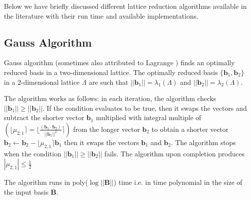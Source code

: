 Below we have briefly discussed different lattice reduction algorithms available in the literature with their run time and available implementations.




\subsection{Gauss Algorithm}
Gauss algorithm \cite{bremner2011lattice} (sometimes also attributed to Lagrange \cite{de1773recherches}) finds an optimally reduced basis in a two-dimensional lattice.
The optimally reduced basis $\{\pmb{b}_1,\pmb{b}_2\}$ in a $2$-dimensional lattice $\Lambda$ are such that $||\pmb{b}_1||=\lambda_1(\Lambda)$ and $||\pmb{b}_2||=\lambda_2(\Lambda)$.


The algorithm works as follows: in each iteration, the algorithm checks $||\pmb{b}_1|| \geq ||\pmb{b}_2||$.
If the condition evaluates to be true, then it swaps the vectors and subtract the shorter vector $\pmb{b}_1$ multiplied with integral multiple of $(\lfloor\mu_{2,1}\rceil = \lfloor \frac{(\pmb{b}_1 \cdot \pmb{b}_2)}{||\pmb{b}_1||^2}\rceil)$ from the longer vector $\pmb{b}_2$ to obtain a shorter vector $\pmb{b}_2 \leftarrow \pmb{b}_2 - \lfloor \mu_{2,1}\rceil\pmb{b}_1$ then it swaps the vectors $\pmb{b}_1$ and $\pmb{b}_2$.
The algorithm stops when the condition $||\pmb{b}_1|| \geq ||\pmb{b}_2||$ fails.
The algorithm upon completion produces $|\mu_{2,1}| \leq \frac{1}{2}$

The algorithm runs in poly($\log{||\pmb{B}||}$) time i.e.
in time polynomial in the size of the input basis $\pmb{B}$.






